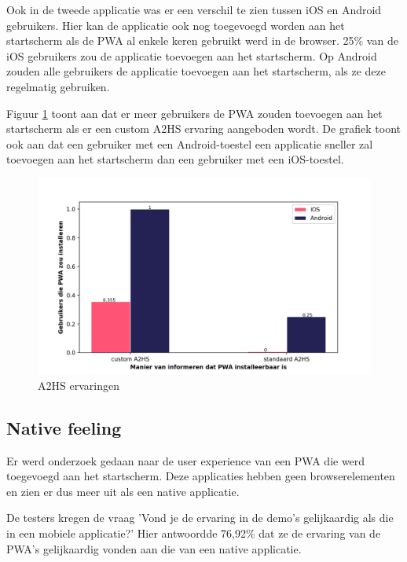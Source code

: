		Ook in de tweede applicatie was er een verschil te zien tussen iOS en Android gebruikers.	
		Hier kan de applicatie ook nog toegevoegd worden aan het startscherm als de PWA al enkele keren gebruikt werd in de browser.
		25\% van de iOS gebruikers zou de applicatie toevoegen aan het startscherm. Op Android zouden alle gebruikers de applicatie toevoegen aan het startscherm, als ze deze regelmatig gebruiken. 
		
		Figuur \ref{fig:A2HSExperience} toont aan dat er meer gebruikers de PWA zouden toevoegen aan het startscherm als er een custom A2HS ervaring aangeboden wordt. De grafiek toont ook aan dat een gebruiker met een Android-toestel een applicatie sneller zal toevoegen aan het startscherm dan een gebruiker met een iOS-toestel.
		
		
		\newpage
		\begin{figure}[H]
				\centering
				\includegraphics[width=120mm]{./img/A2HS_data.png}
				\caption{A2HS ervaringen}
				\label{fig:A2HSExperience}
			\end{figure}
		
		
	
	\subsection{Native feeling}
		
		Er werd onderzoek gedaan naar de user experience van een PWA die werd toegevoegd aan het startscherm. Deze applicaties hebben geen browserelementen en zien er dus meer uit als een native applicatie.
		
		
		De testers kregen de vraag 'Vond je de ervaring in de demo's gelijkaardig als die in een mobiele applicatie?' Hier antwoordde 76,92\% dat ze de ervaring van de PWA's gelijkaardig vonden aan die van een native applicatie.
		
